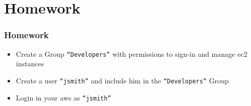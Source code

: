 \documentclass{beamer}
\begin{document}
\section{Homework}
\begin{frame}[fragile]
\frametitle{Homework}
\begin{itemize}
\item Create a Group \texttt{``Developers''} with permissions to sign-in and manage \acrshort{ec2} instances
\item Create a user \texttt{``jsmith''} and include him in the \texttt{``Developers''} Group
\item Login in your \acrshort{aws} as \texttt{``jsmith''}
\end{itemize}
\end{frame}


\end{document}
